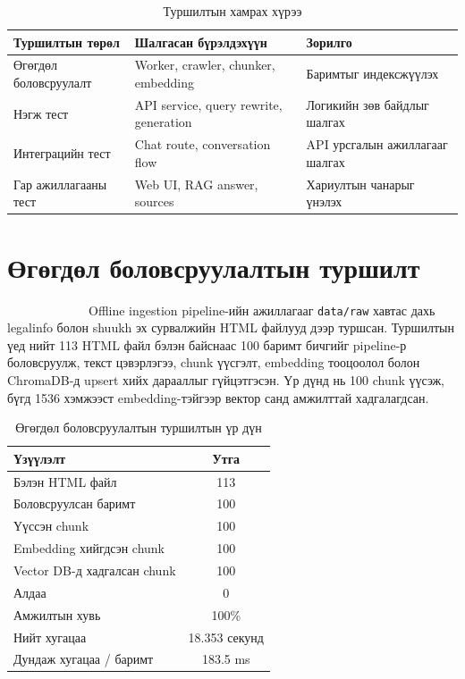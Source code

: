 \documentclass[12pt,A4]{report}
\begin{document}
\begin{table}[H]
\renewcommand{\tablename}{Хүснэгт}
\centering
\caption{Туршилтын хамрах хүрээ}
\begin{tabular}{|l|l|l|}
\hline
\textbf{Туршилтын төрөл} & \textbf{Шалгасан бүрэлдэхүүн} & \textbf{Зорилго} \\
\hline
Өгөгдөл боловсруулалт & Worker, crawler, chunker, embedding & Баримтыг индексжүүлэх \\
Нэгж тест & API service, query rewrite, generation & Логикийн зөв байдлыг шалгах \\
Интеграцийн тест & Chat route, conversation flow & API урсгалын ажиллагааг шалгах \\
Гар ажиллагааны тест & Web UI, RAG answer, sources & Хариултын чанарыг үнэлэх \\
\hline
\end{tabular}
\label{tab:test_scope}
\end{table}

\section{Өгөгдөл боловсруулалтын туршилт}

\ \ \ \ \ \ \ \ \  \ \ \ \ Offline ingestion pipeline-ийн ажиллагааг
\texttt{data/raw} хавтас дахь legalinfo болон shuukh эх сурвалжийн
HTML файлууд дээр туршсан. Туршилтын үед нийт 113 HTML файл бэлэн
байснаас 100 баримт бичгийг pipeline-р боловсруулж, текст цэвэрлэгээ,
chunk үүсгэлт, embedding тооцоолол болон ChromaDB-д upsert хийх
дарааллыг гүйцэтгэсэн. Үр дүнд нь 100 chunk үүсэж, бүгд 1536 хэмжээст
embedding-тэйгээр вектор санд амжилттай хадгалагдсан.

\begin{table}[H]
\renewcommand{\tablename}{Хүснэгт}
\centering
\caption{Өгөгдөл боловсруулалтын туршилтын үр дүн}
\begin{tabular}{|l|c|}
\hline
\textbf{Үзүүлэлт} & \textbf{Утга} \\
\hline
Бэлэн HTML файл & 113 \\
Боловсруулсан баримт & 100 \\
Үүссэн chunk & 100 \\
Embedding хийгдсэн chunk & 100 \\
Vector DB-д хадгалсан chunk & 100 \\
Алдаа & 0 \\
Амжилтын хувь & 100\% \\
Нийт хугацаа & 18.353 секунд \\
Дундаж хугацаа / баримт & 183.5 ms \\
\hline
\end{tabular}
\label{tab:ingestion_result}
\end{table}
\end{document}
